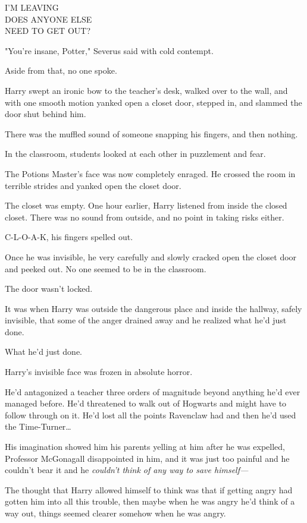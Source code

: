 \begin{writtenNote}
I'M LEAVING\\
DOES ANYONE ELSE\\
NEED TO GET OUT?
\end{writtenNote}

"You're insane, Potter," Severus said with cold contempt.

Aside from that, no one spoke.

Harry swept an ironic bow to the teacher's desk, walked over to the wall, and 
with one smooth motion yanked open a closet door, stepped in, and slammed the 
door shut behind him.

There was the muffled sound of someone snapping his fingers, and then nothing.

In the classroom, students looked at each other in puzzlement and fear.

The Potions Master's face was now completely enraged. He crossed the room in 
terrible strides and yanked open the closet door.

The closet was empty.
\sbreak
One hour earlier, Harry listened from inside the closed closet. There was no 
sound from outside, and no point in taking risks either.

C-L-O-A-K, his fingers spelled out.

Once he was invisible, he very carefully and slowly cracked open the closet 
door and peeked out. No one seemed to be in the classroom.

The door wasn't locked.

It was when Harry was outside the dangerous place and inside the hallway, 
safely invisible, that some of the anger drained away and he realized what he'd 
just done.

What he'd just done.

Harry's invisible face was frozen in absolute horror.

He'd antagonized a teacher three orders of magnitude beyond anything he'd ever 
managed before. He'd threatened to walk out of Hogwarts and might have to 
follow through on it. He'd lost all the points Ravenclaw had and then he'd used 
the Time-Turner{\ldots}

His imagination showed him his parents yelling at him after he was expelled, 
Professor McGonagall disappointed in him, and it was just too painful and he 
couldn't bear it and he \emph{couldn't think of any way to save himself---}

The thought that Harry allowed himself to think was that if getting angry had 
gotten him into all this trouble, then maybe when he was angry he'd think of a 
way out, things seemed clearer somehow when he was angry.


